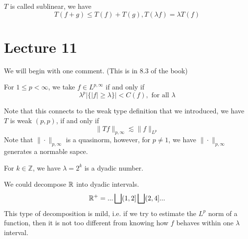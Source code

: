 \begin{definition}
    $T$ is called sublinear, we have 
    \begin{equation*}
        T(f+g)\leq T(f)+T(g), T(\lambda f)=\lambda T(f)
    \end{equation*}
\end{definition}

\section{Lecture 11}
We will begin with one comment. (This is in 8.3 of the book)
\begin{definition}
    For $1\leq p<\infty$, we take $f\in L^{p,\infty}$ if and only if
    \begin{equation*}
        \lambda^p|\{|f|\geq\lambda\}|<C(f), \text{ for all } \lambda
    \end{equation*}
\end{definition}
Note that this connects to the weak type definition that we introduced,
we have $T$ is weak $(p,p)$, if and only if 
\begin{equation*}
    \|Tf\|_{p,\infty}\lesssim \|f\|_{L^p}
\end{equation*}
Note that $\|\cdot\|_{p,\infty}$ is a quasinorm, however, for $p\neq 1$, we have $\|\cdot\|_{p,\infty}$ generates a normable sapce.

\begin{definition}
    For $k\in\mathbb{Z}$, we have $\lambda=2^k$ is a dyadic number.
\end{definition}
We could decompose $\mathbb{R}$ into dyadic intervals.
\begin{equation*}
    \mathbb{R}^+=...\bigsqcup (1,2]\bigsqcup (2,4]...
\end{equation*}
This type of decomposition is mild, i.e. if we try to estimate the $L^p$ norm of a function, then it is not too different from knowing how $f$ behaves within one $\lambda$ interval.

